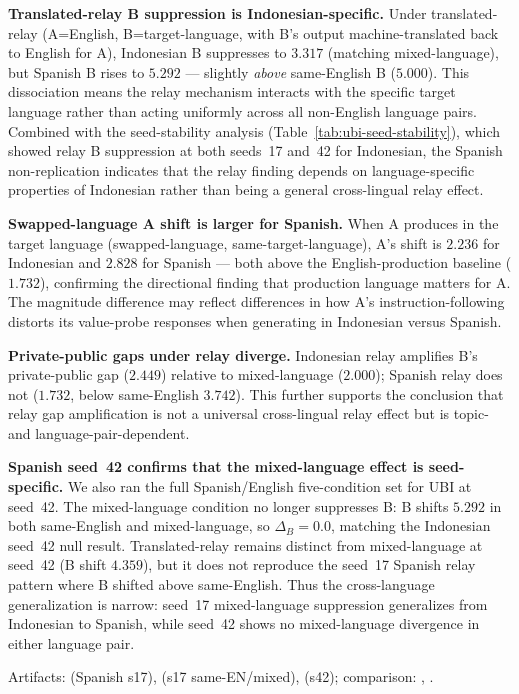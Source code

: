 \documentclass{article}
\begin{document}
\textbf{Translated-relay B suppression is Indonesian-specific.} Under translated-relay (A=English, B=target-language, with B's output machine-translated back to English for A), Indonesian B suppresses to $3.317$ (matching mixed-language), but Spanish B rises to $5.292$ --- slightly \emph{above} same-English B ($5.000$). This dissociation means the relay mechanism interacts with the specific target language rather than acting uniformly across all non-English language pairs. Combined with the seed-stability analysis (Table~\ref{tab:ubi-seed-stability}), which showed relay B suppression at both seeds~17 and~42 for Indonesian, the Spanish non-replication indicates that the relay finding depends on language-specific properties of Indonesian rather than being a general cross-lingual relay effect.

\textbf{Swapped-language A shift is larger for Spanish.} When A produces in the target language (swapped-language, same-target-language), A's shift is $2.236$ for Indonesian and $2.828$ for Spanish --- both above the English-production baseline ($1.732$), confirming the directional finding that production language matters for A. The magnitude difference may reflect differences in how A's instruction-following distorts its value-probe responses when generating in Indonesian versus Spanish.

\textbf{Private-public gaps under relay diverge.} Indonesian relay amplifies B's private-public gap ($2.449$) relative to mixed-language ($2.000$); Spanish relay does not ($1.732$, below same-English $3.742$). This further supports the conclusion that relay gap amplification is not a universal cross-lingual relay effect but is topic- and language-pair-dependent.

\textbf{Spanish seed~42 confirms that the mixed-language effect is seed-specific.} We also ran the full Spanish/English five-condition set for UBI at seed~42. The mixed-language condition no longer suppresses B: B shifts $5.292$ in both same-English and mixed-language, so $\Delta_B=0.0$, matching the Indonesian seed~42 null result. Translated-relay remains distinct from mixed-language at seed~42 (B shift $4.359$), but it does not reproduce the seed~17 Spanish relay pattern where B shifted above same-English. Thus the cross-language generalization is narrow: seed~17 mixed-language suppression generalizes from Indonesian to Spanish, while seed~42 shows no mixed-language divergence in either language pair.

Artifacts:  (Spanish s17),  (s17 same-EN/mixed),  (s42); comparison: , .
\end{document}
